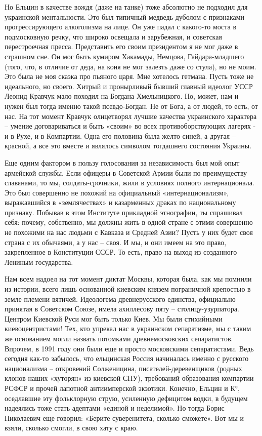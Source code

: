 \begin{itemize}
\begin{itemize}
\begin{multicols}{2}
Но Ельцин в качестве вождя (даже на танке) тоже абсолютно не подходил для
украинской ментальности. Это был типичный медведь-дуболом с признаками
прогрессирующего алкоголизма на лице. Он уже падал с какого-то моста в
подмосковную речку, что широко освещала и зарубежная, и советская перестроечная
пресса. Представить его своим президентом я не мог даже в страшном сне. Он мог
быть кумиром Хакамады, Немцова, Гайдара-младшего (того, что, в отличие от деда,
на коня не мог залезть даже со стула), но не моим. Это была не моя сказка про
пьяного царя. Мне хотелось гетмана. Пусть тоже не идеального, но своего. Хитрый
и пронырливый бывший главный идеолог УССР Леонид Кравчук мало походил на
Богдана Хмельницкого. Но, может, нам и нужен был тогда именно такой
псевдо-Богдан. Не от Бога, а от людей, то есть, от нас. На тот момент Кравчук
олицетворял лучшие качества украинского характера – умение договариваться и
быть «своим» во всех противоборствующих лагерях - и в Рухе, и в Компартии.
Одна его половина была желто-синей, а другая – красной, а все это вместе и
являлось символом тогдашнего состояния Украины.
 
Еще одним фактором в пользу голосования за независимость был мой опыт армейской
службы. Если офицеры в Советской Армии были по преимуществу славянами, то мы,
солдаты-срочники, жили в условиях полного интернационала. Это был совершенно не
похожий на официальный «интернационализм», выражавшийся в «землячествах» и
казарменных драках по национальному признаку. Побывав в этом Институте
прикладной этнографии, ты спрашивал себя: почему, собственно, мы должны жить в
одной стране с этими совершенно не похожими на нас людьми с Кавказа и Средней
Азии? Пусть у них будет своя страна с их обычаями, а у нас – своя. И мы, и они
имеем на это право, закрепленное в Конституции СССР. То есть, право на выход из
созданного Лениным государства.

Нам всем надоел на тот момент диктат Москвы, которая была, как мы помнили из истории, всего лишь основанной киевским князем пограничной крепостью в земле племени вятичей. Идеологема древнерусского единства, официально принятая в Советском Союзе, имела ахиллесову пяту – столицу-узурпатора. Центром Киевской Руси мог быть только Киев. Мы были стихийными киевоцентристами! Тех, кто упрекал нас в украинском сепаратизме, мы с таким же основанием могли назвать потомками древнемосковских сепаратистов. Впрочем, в 1991 году они были еще и просто московскими сепаратистами. Ведь сегодня как-то забылось, что ельцинская Россия начиналась именно с русского национализма – откровений Солженицина, писателей-деревенщиков (родных клонов наших «хуторян» из киевской СПУ), требований образования компартии РСФСР и прочей лапотной антиимперской экзотики. Конечно, Ельцин и К°, оседлавшие эту фольклорную струю, усиленную дефицитом водки, в будущем надеялись тоже стать адептами «единой и неделимой». Но тогда Борис Николаевич еще говорил: «Берите суверенитета, сколько сможете». Вот мы и взяли, сколько смогли, в свою хату с краю.


\end{multicols}
\end{itemize}
\end{itemize}
